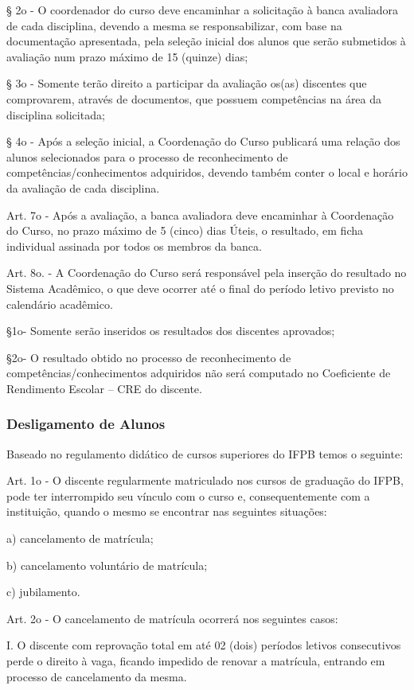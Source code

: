 	§ 2o - O coordenador do curso deve encaminhar a solicitação à banca avaliadora de cada disciplina, devendo a mesma se responsabilizar, com base na documentação apresentada, pela seleção inicial dos alunos que serão submetidos à avaliação num prazo máximo de 15 (quinze) dias;
	
	§ 3o - Somente terão direito a participar da avaliação os(as) discentes que comprovarem, através de documentos, que possuem competências na área da disciplina solicitada;
	
	§ 4o - Após a seleção inicial, a Coordenação do Curso publicará uma relação dos alunos selecionados para o processo de reconhecimento de competências/conhecimentos adquiridos, devendo também conter o local e horário da avaliação de cada disciplina.
	
	Art. 7o - Após a avaliação, a banca avaliadora deve encaminhar à Coordenação do Curso, no prazo máximo de 5 (cinco) dias Úteis, o resultado, em ficha individual assinada por todos os membros da banca.
	
	Art. 8o. - A Coordenação do Curso será responsável pela inserção do resultado no Sistema Acadêmico, o que deve ocorrer até o final do período letivo previsto no calendário acadêmico.
	
	§1o- Somente serão inseridos os resultados dos discentes aprovados;
	
	§2o- O resultado obtido no processo de reconhecimento de competências/conhecimentos adquiridos não será computado no Coeficiente de Rendimento Escolar – CRE do discente.
	
\subsubsection{Desligamento de Alunos}

Baseado no regulamento didático de cursos superiores do IFPB temos o seguinte:

	Art. 1o - O discente regularmente matriculado nos cursos de graduação do IFPB, pode ter interrompido seu vínculo com o curso e, consequentemente com a instituição, quando o mesmo se encontrar nas seguintes situações:

	a) cancelamento de matrícula;

	b) cancelamento voluntário de matrícula; 
	
	c) jubilamento.

Art. 2o - O cancelamento de matrícula ocorrerá nos seguintes casos:

I. O discente com reprovação total em até 02 (dois) períodos letivos consecutivos perde o direito à vaga, ficando impedido de renovar a matrícula, entrando em processo de cancelamento da mesma.


